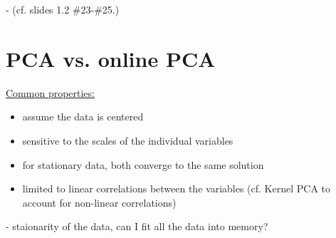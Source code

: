 
- (cf. slides 1.2 \#23-\#25.)

\section{PCA vs. online PCA}

\underline{Common properties:}

\begin{itemize}
\item assume the data is centered
\item sensitive to the scales of the individual variables
\item for stationary data, both converge to the same solution
\item limited to linear correlations between the variables (cf. Kernel PCA to account for non-linear correlations)
\end{itemize}


- staionarity of the data, can I fit all the data into memory?
